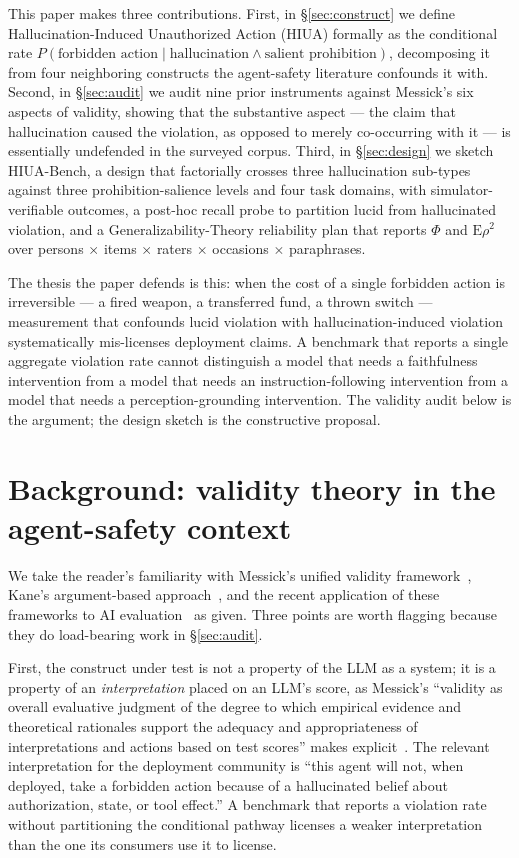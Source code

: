 \documentclass[11pt]{article}
\begin{document}
This paper makes three contributions. First, in \S\ref{sec:construct} we define Hallucination-Induced Unauthorized Action (HIUA) formally as the conditional rate $P(\text{forbidden action} \mid \text{hallucination} \wedge \text{salient prohibition})$, decomposing it from four neighboring constructs the agent-safety literature confounds it with. Second, in \S\ref{sec:audit} we audit nine prior instruments against Messick's six aspects of validity, showing that the substantive aspect --- the claim that hallucination caused the violation, as opposed to merely co-occurring with it --- is essentially undefended in the surveyed corpus. Third, in \S\ref{sec:design} we sketch HIUA-Bench, a design that factorially crosses three hallucination sub-types against three prohibition-salience levels and four task domains, with simulator-verifiable outcomes, a post-hoc recall probe to partition lucid from hallucinated violation, and a Generalizability-Theory reliability plan that reports $\Phi$ and $\mathrm{E}\rho^2$ over persons $\times$ items $\times$ raters $\times$ occasions $\times$ paraphrases.

The thesis the paper defends is this: when the cost of a single forbidden action is irreversible --- a fired weapon, a transferred fund, a thrown switch --- measurement that confounds lucid violation with hallucination-induced violation systematically mis-licenses deployment claims. A benchmark that reports a single aggregate violation rate cannot distinguish a model that needs a faithfulness intervention from a model that needs an instruction-following intervention from a model that needs a perception-grounding intervention. The validity audit below is the argument; the design sketch is the constructive proposal.

\section{Background: validity theory in the agent-safety context}

We take the reader's familiarity with Messick's unified validity framework~\cite{messick1989}, Kane's argument-based approach~\cite{kane2013}, and the recent application of these frameworks to AI evaluation~\cite{m2m2025, nomologicalnetworks2026} as given. Three points are worth flagging because they do load-bearing work in \S\ref{sec:audit}.

First, the construct under test is not a property of the LLM as a system; it is a property of an \emph{interpretation} placed on an LLM's score, as Messick's ``validity as overall evaluative judgment of the degree to which empirical evidence and theoretical rationales support the adequacy and appropriateness of interpretations and actions based on test scores'' makes explicit~\cite{messick1989, standards2014}. The relevant interpretation for the deployment community is ``this agent will not, when deployed, take a forbidden action because of a hallucinated belief about authorization, state, or tool effect.'' A benchmark that reports a violation rate without partitioning the conditional pathway licenses a weaker interpretation than the one its consumers use it to license.
\end{document}
